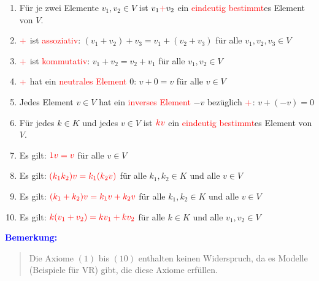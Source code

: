 \documentclass{article}
\newcommand{\red}[1]{\textcolor{red}{#1}}
\newcommand{\blue}[1]{\textcolor{blue}{#1}}
\newcommand{\an}[1]{\blue{\textbf{Bemerkung: }}\begin{quote}#1\end{quote}}
\begin{document}
\begin{enumerate}
    \item Für je zwei Elemente $v_1,v_2 \in V$ ist $v_1 \red{+} v_2$ ein \red{eindeutig bestimmt}es Element von $V$.
    \item $\red{+}$ ist \red{assoziativ}: $(v_1 + v_2) + v_3 = v_1 + (v_2 + v_3)$ für alle $v_1,v_2,v_3 \in V$
    \item $\red{+}$ ist \red{kommutativ}: $v_1 + v_2 = v_2 + v_1$ für alle $v_1,v_2 \in V$
    \item $\red{+}$ hat ein \red{neutrales Element} $0$: $v + 0 = v$ für alle $v \in V$
    \item Jedes Element $v \in V$ hat ein \red{inverses Element} $-v$ bezüglich $\red{+}$: $v + (-v) = 0$
    \item Für jedes $k \in K$ und jedes $v \in V$ ist $\red{kv}$ ein \red{eindeutig bestimmt}es Element von $V$.
    \item Es gilt: $\red{1v = v}$ für alle $v \in V$
    \item Es gilt: $\red{(k_1k_2)v = k_1(k_2v)}$ für alle $k_1,k_2 \in K$ und alle $v \in V$
    \item Es gilt: $\red{(k_1 + k_2)v = k_1v + k_2v}$ für alle $k_1,k_2 \in K$ und alle $v \in V$
    \item Es gilt: $\red{k(v_1 + v_2) = kv_1 + kv_2}$ für alle $k \in K$ und alle $v_1,v_2 \in V$
\end{enumerate}

\an{
    Die Axiome $(1)$ bis $(10)$ enthalten keinen Widerspruch, da es Modelle (Beispiele für VR) gibt, die diese Axiome erfüllen.
}
\end{document}
